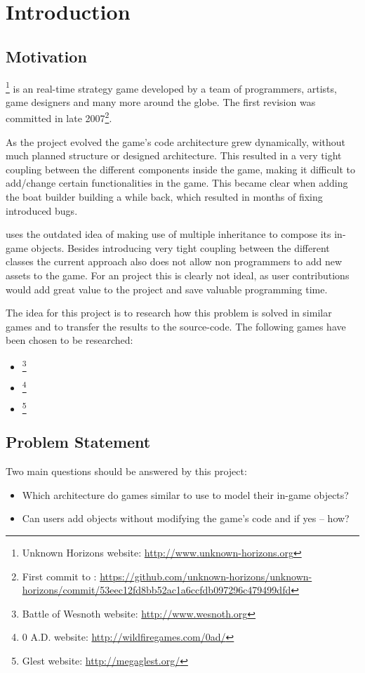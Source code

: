 

\section{Introduction}

\subsection{Motivation}
\UH{}\footnote{Unknown Horizons website: \url{http://www.unknown-horizons.org}} is an \OS{} real-time strategy game developed by a team of programmers, artists, game
designers and many more around the globe. The first revision was committed in late 2007\footnote{First commit to \UH{}:
\url{https://github.com/unknown-horizons/unknown-horizons/commit/53eec12fd8bb52ac1a6ccfdb097296c479499dfd}}.

As the project evolved the game's code architecture grew dynamically, without much planned structure or
designed architecture. This resulted in a very tight coupling between the different components inside the game, making
it difficult to add/change certain functionalities in the game. This became clear when adding the boat builder building
a while back, which resulted in months of fixing introduced bugs.

\UH{} uses the outdated idea of making use of multiple inheritance to compose its in-game objects. Besides introducing
very tight coupling between the different classes the current approach also does not allow non programmers to add new
assets to the game. For an \OS{} project this is clearly not ideal, as user contributions would add great value to the
project and save valuable programming time.

The idea for this project is to research how this problem is solved in similar \OS{} games and to transfer the results to
the \UH{} source-code. The following games have been chosen to be researched:
\begin{itemize}
    \item \BOW{}\footnote{Battle of Wesnoth website: \url{http://www.wesnoth.org}}
    \item \AD{}\footnote{0 A.D. website: \url{http://wildfiregames.com/0ad/}}
    \item \GLEST{}\footnote{Glest website: \url{http://megaglest.org/}}
\end{itemize}


\subsection{Problem Statement}
Two main questions should be answered by this project:
\begin{itemize}
    \item Which architecture do \OS{} games similar to \UH{} use to model their in-game objects?
    \item Can users add objects without modifying the game's code and if yes -- how?
\end{itemize}

